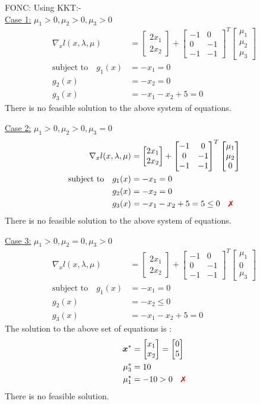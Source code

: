 \documentclass[a4paper,11pt]{article}
\newcommand{\V}[1]{\boldsymbol{#1}}
\newcommand{\mat}[1]{\begin{bmatrix}#1\end{bmatrix}}
\newcommand{\xmark}{{\color{red}\text{\ding{55}}}}%
\begin{document}
\noindent FONC: Using KKT:-\\

\noindent\underline{Case 1:} $\mu_1>0, \mu_2>0, \mu_3>0$
\begin{align*}
 \nabla_x l(x,\lambda,\mu) &= \mat{2x_1\\ 2x_2} +
\mat{-1& 0\\ 0& -1\\-1& -1}^T\mat{\mu_1\\ \mu_2\\ \mu_3}\\
% 
 \text{subject to}\quad g_1(x)&=-x_1 = 0\\
 g_2(x)&=-x_2 = 0\\
 g_3(x)&= -x_1 -x_2 +5=0
\end{align*}
There is no feasible solution to the above system of equations.

\noindent\underline{Case 2:} $\mu_1>0, \mu_2>0, \mu_3=0$
\begin{align*}
 \nabla_x l(x,\lambda,\mu) &= \mat{2x_1\\ 2x_2} +
\mat{-1& 0\\ 0& -1\\-1& -1}^T\mat{\mu_1\\ \mu_2\\ 0}\\
% 
 \text{subject to}\quad g_1(x)&=-x_1 = 0\\
 g_2(x)&=-x_2 = 0\\
 g_3(x)&= -x_1 -x_2 +5 = 5\leq0 \quad \xmark
\end{align*}
There is no feasible solution to the above system of equations.

\noindent\underline{Case 3:} $\mu_1>0, \mu_2=0, \mu_3>0$
\begin{align*}
 \nabla_x l(x,\lambda,\mu) &= \mat{2x_1\\ 2x_2} +
\mat{-1& 0\\ 0& -1\\-1& -1}^T\mat{\mu_1\\ 0\\ \mu_3}\\
% 
 \text{subject to}\quad g_1(x)&=-x_1 = 0\\
 g_2(x)&=-x_2 \leq 0\\
 g_3(x)&= -x_1 -x_2 +5 =0 
\end{align*}
The solution to the above set of equations is :
\begin{align*}
 \V{x}^*&=\mat{x_1\\x_2} = \mat{0\\5}\\
 \mu_3^*&=10\\
 \mu_1^*&=-10>0 \quad \xmark
\end{align*}
There is no feasible solution.
\end{document}
